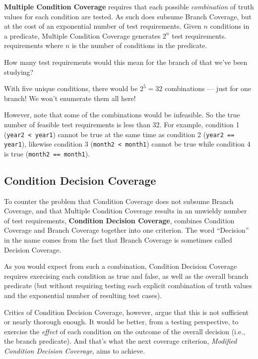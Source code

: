 {\bf Multiple Condition Coverage} requires that each possible {\it combination}
of truth values for each condition are tested. As such does subsume Branch
Coverage, but at the cost of an exponential number of test requirements. 
%
Given $n$ conditions in a predicate, Multiple Condition Coverage generates $2^n$
test requirements. requirements where $n$ is the number of conditions in the
predicate.


How many test requirements would this mean for the branch of
\daysbetweentwodatesmethod that we've been studying?


With five unique conditions, there would be $2^5 = 32$ combinations --- just for
one branch! 
%
We won't enumerate them all here!

However, note that some of the combinations would be infeasible. So the true
number of feasible test requirements is less than 32. For example, condition 1
({\tt year2 < year1}) cannot be true at the same time as condition 2 ({\tt year2
== year1}), likewise condition 3 ({\tt month2 < month1}) cannot be true while
condition 4 is true ({\tt month2 == month1}). 


\subsection{Condition Decision Coverage}

To counter the problem that Condition Coverage does not subsume Branch Coverage,
and that Multiple Condition Coverage results in an unwieldy number of test
requirements, {\bf Condition Decision Coverage}, combines Condition Coverage and
Branch Coverage together into one criterion. The word ``Decision'' in the name
comes from the fact that Branch Coverage is sometimes called Decision Coverage.

As you would expect from such a combination, Condition Decision Coverage
requires exercising each condition as true and false, as well as the overall
branch predicate (but without requiring testing each explicit combination of
truth values and the exponential number of resulting test cases).

Critics of Condition Decision Coverage, however, argue that this is not
sufficient or nearly thorough enough. It would be better, from a testing
perspective, to exercise the {\it effect} of each condition on the outcome of
the overall decision (i.e., the branch predicate). And that's what the next
coverage criterion, {\it Modified Condition Decision Coverage}, aims to achieve.


